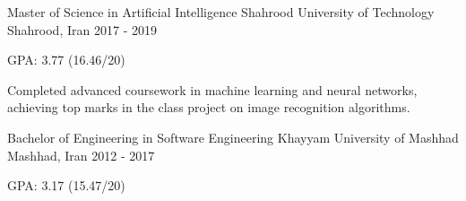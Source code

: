 

\begin{cventries}

  \cventry
    {Master of Science in Artificial Intelligence} %
    {Shahrood University of Technology} %
    {Shahrood, Iran} %
    {2017 - 2019} %
    {
      \begin{cvitems} %
      	\item {GPA: 3.77 (16.46/20)}
      	\item{Completed advanced coursework in machine learning and neural networks, achieving top marks in the class project on image recognition algorithms.}
      \end{cvitems}
    }
    
    \cventry
    {Bachelor of Engineering in Software Engineering} %
    {Khayyam University of Mashhad} %
    {Mashhad, Iran} %
    {2012 - 2017} %
    {
    \begin{cvitems} %
    	\item {GPA: 3.17 (15.47/20)}
    \end{cvitems}
    }

\end{cventries}
